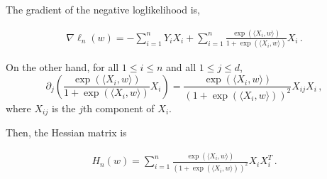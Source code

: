 \documentclass[xcolor={usenames,dvipsnames},handout]{beamer}
\begin{document}
%
%
%
%
%

\begin{frame}
The \alert{gradient of the negative loglikelihood} is, 

\begin{align*}
\nabla \ell_n(w) = - \sum_{i=1}^n Y_i X_i + \sum_{i=1}^n \frac{\exp(\langle X_{i},w\rangle)}{1  + \exp(\langle X_{i},w\rangle)} X_i\,.
\end{align*}

\vspace{.2cm}

On the other hand, for all $1\leqslant i \leqslant n$ and all $1 \leqslant j \leqslant d$,
\[
\partial_j \left( \frac{\exp(\langle X_{i},w\rangle)}{1  + \exp(\langle X_{i},w\rangle)} X_i \right) = \frac{\exp(\langle X_{i},w\rangle)}{(1  + \exp(\langle X_{i},w\rangle))^2} X_{ij}X_i\,,
\]
where $X_{ij}$ is the $j$th component of $X_i$. 

\vspace{.2cm}

Then, the \alert{Hessian matrix} is

\begin{align*}
H_n(w) = \sum_{i=1}^n \frac{\exp(\langle X_{i},w\rangle)}{(1  + \exp(\langle X_{i},w\rangle))^2} X_{i} X^T_{i}\,.
\end{align*}
%

\end{frame}
\end{document}
